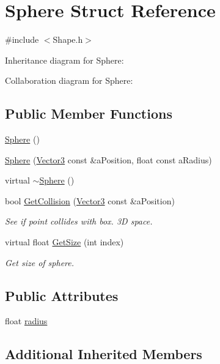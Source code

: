 \hypertarget{structSphere}{}\section{Sphere Struct Reference}
\label{structSphere}


{\ttfamily \#include $<$Shape.\+h$>$}



Inheritance diagram for Sphere\+:


Collaboration diagram for Sphere\+:
\subsection*{Public Member Functions}
\begin{DoxyCompactItemize}
\item 
\hyperlink{structSphere_a890a63ff583cb88e7ec4e840b4ef5eb9}{Sphere} ()
\item 
\hyperlink{structSphere_ae7934d10defda06aa1813c67c3eeb575}{Sphere} (\hyperlink{structVector3}{Vector3} const \&a\+Position, float const a\+Radius)
\item 
virtual \hyperlink{structSphere_a569c071e50a3e11f678630ee1a17737e}{$\sim$\+Sphere} ()
\item 
bool \hyperlink{structSphere_a66bc9b3327babf9b9363ef0d7ed02138}{Get\+Collision} (\hyperlink{structVector3}{Vector3} const \&a\+Position)
\begin{DoxyCompactList}\small\item\em See if point collides with box. 3D space. \end{DoxyCompactList}\item 
virtual float \hyperlink{structSphere_a310ace56647ecd875fb8801a26aa7f25}{Get\+Size} (int index)
\begin{DoxyCompactList}\small\item\em Get size of sphere. \end{DoxyCompactList}\end{DoxyCompactItemize}
\subsection*{Public Attributes}
\begin{DoxyCompactItemize}
\item 
float \hyperlink{structSphere_ae6f42f0da6679a2f0b4a22681ccccf38}{radius}
\end{DoxyCompactItemize}
\subsection*{Additional Inherited Members}


